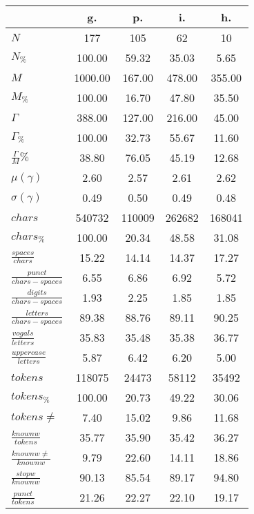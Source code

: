 \begin{table}[h!]
\begin{center}
\begin{tabular}{| l || c | c | c | c |}\hline
 & {\bf g.} & {\bf p.} & {\bf i.} & {\bf h.} \\\hline\hline
$N$ & 177  & 105  & 62  & 10 \\
$N_{\%}$ & 100.00  & 59.32  & 35.03  & 5.65 \\\hline
$M$ & 1000.00  & 167.00  & 478.00  & 355.00 \\
$M_{\%}$ & 100.00  & 16.70  & 47.80  & 35.50 \\\hline
$\Gamma$ & 388.00  & 127.00  & 216.00  & 45.00 \\
$\Gamma_{\%}$ & 100.00  & 32.73  & 55.67  & 11.60 \\\hline
$\frac{\Gamma}{M}\%$ & 38.80  & 76.05  & 45.19  & 12.68 \\
$\mu(\gamma)$ & 2.60  & 2.57  & 2.61  & 2.62 \\
$\sigma(\gamma)$ & 0.49  & 0.50  & 0.49  & 0.48 \\\hline\hline
$chars$ & 540732  & 110009  & 262682  & 168041 \\
$chars_{\%}$ & 100.00  & 20.34  & 48.58  & 31.08 \\\hline
$\frac{spaces}{chars}$ & 15.22  & 14.14  & 14.37  & 17.27 \\
$\frac{punct}{chars-spaces}$ & 6.55  & 6.86  & 6.92  & 5.72 \\
$\frac{digits}{chars-spaces}$ & 1.93  & 2.25  & 1.85  & 1.85 \\\hline
$\frac{letters}{chars-spaces}$ & 89.38  & 88.76  & 89.11  & 90.25 \\
$\frac{vogals}{letters}$ & 35.83  & 35.48  & 35.38  & 36.77 \\
$\frac{uppercase}{letters}$ & 5.87  & 6.42  & 6.20  & 5.00 \\\hline\hline
$tokens$ & 118075  & 24473  & 58112  & 35492 \\
$tokens_{\%}$ & 100.00  & 20.73  & 49.22  & 30.06 \\
$tokens \neq$ & 7.40  & 15.02  & 9.86  & 11.68 \\\hline
$\frac{knownw}{tokens}$ & 35.77  & 35.90  & 35.42  & 36.27 \\
$\frac{knownw \neq}{knownw}$ & 9.79  & 22.60  & 14.11  & 18.86 \\\hline
$\frac{stopw}{knownw}$ & 90.13  & 85.54  & 89.17  & 94.80 \\
$\frac{punct}{tokens}$ & 21.26  & 22.27  & 22.10  & 19.17 \\

\end{tabular}
\end{center}
\end{table}
